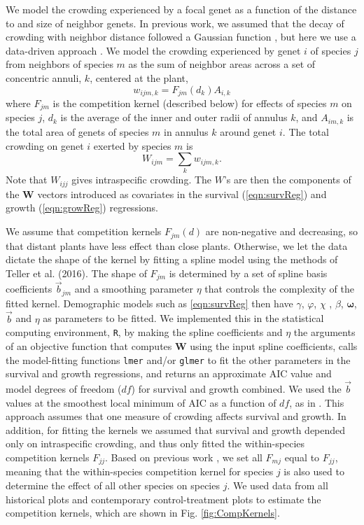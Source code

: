 \documentclass[11pt]{article}
\begin{document}
\begin{doublespacing}
We model the crowding experienced by a focal genet as a function of the distance to and size of neighbor genets. In previous work, we assumed that the decay of crowding with neighbor distance followed a Gaussian function \citep{chu_large_2015}, but here we use a data-driven approach \citep{teller_linking_2016}. We model the crowding experienced by genet $i$ of species $j$ from neighbors of species $m$ as the sum of neighbor areas across a set of concentric annuli, $k$, centered at the plant,
\begin{equation}
w_{ijm,k} = F_{jm}(d_{k})A_{i,k}     
\label{eqn:wik}
\end{equation}
where $F_{jm}$ is the competition kernel (described below) for effects of species $m$ on species $j$, 
$d_{k}$ is the average of the inner and outer radii of annulus $k$, 
and $A_{im,k}$ is the total area of genets of species $m$ in annulus $k$ around genet $i$. The total crowding on 
genet $i$ exerted by species $m$ is
\begin{equation}
W_{ijm}  =\sum_k {w_{ijm,k}} .
\label{eqn:wijm}
\end{equation} 
Note that $W_{ijj}$ gives intraspecific crowding. The $W$'s are then the components of the $\boldsymbol{W}$ vectors 
introduced as covariates in the survival (\ref{eqn:survReg}) and growth (\ref{eqn:growReg}) regressions.

We assume that competition kernels $F_{jm}(d)$ are non-negative and decreasing, so that distant plants have less effect 
than close plants. Otherwise, we let the data dictate the shape of the kernel by fitting a spline model 
using the methods of Teller et al. (2016). The shape of $F_{jm}$ is determined by a set of spline basis coefficients $\vec{b}_{jm}$
and a smoothing parameter $\eta$ that controls the complexity of the fitted kernel. 
Demographic models such as \eqref{eqn:survReg} then have $\gamma$, $\varphi$, $\chi$ , 
$\beta$, $\boldsymbol{\omega}$, $\vec{b}$ and $\eta$ as parameters to be fitted. We implemented this in the statistical computing environment, \texttt{R}, 
by making the spline coefficients and $\eta$ the arguments of an objective function that computes $\boldsymbol{W}$ using the input spline coefficients, 
calls the model-fitting functions \texttt{lmer} and/or \texttt{glmer} to fit the other parameters in the survival and growth regressions, 
and returns an approximate AIC value and model degrees of freedom ($df$) for survival and growth combined. We used the $\vec{b}$ values at the smoothest 
local minimum of AIC as a function of $df$, as in \cite{teller_linking_2016}. This approach assumes that one measure of crowding affects 
survival and growth. In addition, for fitting the kernels we assumed that survival and growth depended only on intraspecific crowding, and thus only fitted the
within-species competition kernels $F_{jj}$. Based on previous work \citep{adler_coexistence_2010}, we set all $F_{mj}$ equal to $F_{jj}$, meaning that 
the within-species competition kernel for species $j$ is also used to determine the effect of all other species on species $j$. We used data from all historical plots and contemporary control-treatment plots to estimate the competition kernels, which are shown in Fig. \ref{fig:CompKernels}. 


\end{doublespacing}
\end{document}

